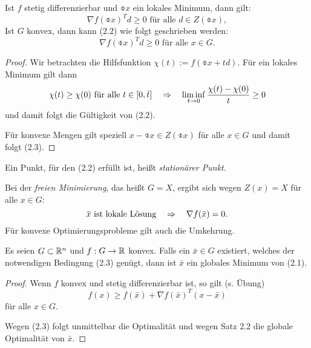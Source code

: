 \begin{aus}
  Ist $f$ stetig differenzierbar und $\obar{x}$ ein lokales Minimum, dann gilt:
  \begin{equation}
    \nabla f(\obar{x})^T d \ge 0 \text{ für alle } d \in Z(\obar{x}),
  \end{equation}
  Ist $G$ konvex, dann kann (2.2) wie folgt geschrieben werden:
  \begin{equation}
    \nabla f(\obar{x})^T d \ge 0 \text{ für alle } x \in G.
  \end{equation}
\end{aus}

\begin{proof}
  Wir betrachten die Hilfsfunktion $\chi(t) := f( \obar{x} + td)$. Für ein lokales
  Minimum gilt dann
  \[ \chi(t) \ge \chi(0) \text{ für alle } t \in [0,\obar{t}]
    \qRq
    \liminf_{t \to 0} \frac{\chi(t) - \chi(0)}{t} \ge 0 \]
  und damit folgt die Gültigkeit von (2.2).

  Für konvexe Mengen gilt speziell $x - \obar{x} \in Z(\obar{x})$ für alle $x
  \in G$ und damit folgt (2.3).
\end{proof}

\begin{rmrk}
  Ein Punkt, für den (2.2) erfüllt ist, heißt \emph{stationärer Punkt}.
\end{rmrk}

\begin{rmrk} %
  Bei der \emph{freien Minimierung}, das heißt $G = X$, ergibt sich wegen $Z(x)
  = X$ für alle $x \in G$:
  \[ \obar{x} \text{ ist lokale Lösung} \qRq \nabla f(\obar{x}) = 0. \]
  Für konvexe Optimierungsprobleme gilt auch die Umkehrung.
\end{rmrk}

\begin{aus}
  Es seien $G \subset \mathbb{R}^n$ und $f: G \to \mathbb{R}$ konvex. Falls ein $\bar{x}
  \in G$ existiert, welches der notwendigen Bedingung (2.3) genügt, dann ist
  $\bar{x}$ ein globales Minimum von (2.1).
\end{aus}

\begin{proof}
  Wenn $f$ konvex und stetig differenzierbar ist, so gilt (s. Übung)
  \[ f(x) \ge f( \bar{x} ) + \nabla f( \bar{x} )^T (x - \bar{x}) \]
  für alle $x \in G$.

  Wegen (2.3) folgt unmittelbar die Optimalität und wegen Satz 2.2 die globale
  Optimalität von $\bar{x}$.
\end{proof}

